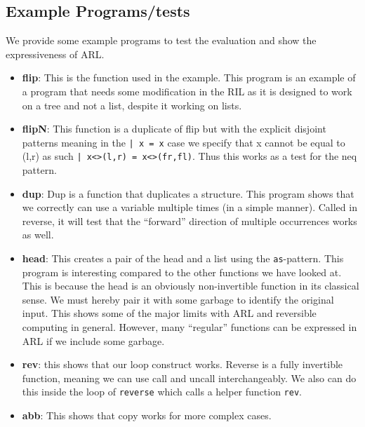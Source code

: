 \documentclass[a4paper]{article}
\begin{document}
\subsection{Example Programs/tests}
\label{sec:orge22c22d}
We provide some example programs to test the evaluation and show the expressiveness of ARL.

\begin{itemize}
\item \textbf{flip}: This is the function used in the example. This program is an example of a program that needs some modification in the RIL as it is designed to work on a tree and not a list, despite it working on lists.
\item \textbf{flipN}: This function is a duplicate of flip but with the explicit disjoint patterns meaning in the \texttt{| x = x} case we specify that x cannot be equal to (l,r) as such \texttt{| x<>(l,r) = x<>(fr,fl)}. Thus this works as a test for the neq pattern.
\item \textbf{dup}: Dup is a function that duplicates a structure. This program shows that we correctly can use a variable multiple times (in a simple manner). Called in reverse, it will test that the ``forward'' direction of multiple occurrences works as well.
\item \textbf{head}: This creates a pair of the head and a list using the \texttt{as}-pattern. This program is interesting compared to the other functions we have looked at. This is because the head is an obviously non-invertible function in its classical sense. We must hereby pair it with some garbage to identify the original input. This shows some of the major limits with ARL and reversible computing in general. However, many ``regular'' functions can be expressed in ARL if we include some garbage.
\item \textbf{rev}: this shows that our loop construct works. Reverse is a fully invertible function, meaning we can use call and uncall interchangeably. We also can do this inside the loop of \texttt{reverse} which calls a helper function \texttt{rev}.
\item \textbf{abb}: This shows that copy works for more complex cases.
\end{itemize}
\end{document}
